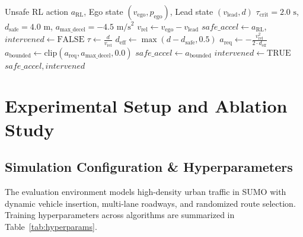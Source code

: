 \documentclass{svproc}
\begin{document}
\begin{algorithm}[htbp]
\caption{Bio-Inspired TTC Safety Shield Gatekeeper ($\mathcal{S}_{\text{TTC}}$)}
\label{alg:bio_shield}
\begin{algorithmic}[1]
\REQUIRE Unsafe RL action $a_{\text{RL}}$, Ego state $(v_{\text{ego}}, p_{\text{ego}})$, Lead state $(v_{\text{lead}}, d)$
\PARAM $\tau_{\text{crit}} = 2.0\text{ s}$, $d_{\text{safe}} = 4.0\text{ m}$, $a_{\text{max\_decel}} = -4.5\text{ m/s}^2$
\STATE $v_{\text{rel}} \leftarrow v_{\text{ego}} - v_{\text{lead}}$
\STATE $safe\_accel \leftarrow a_{\text{RL}}$, $intervened \leftarrow \text{FALSE}$
    \STATE $\tau \leftarrow \frac{d}{v_{\text{rel}}}$
        \STATE $d_{\text{eff}} \leftarrow \max(d - d_{\text{safe}}, 0.5)$
        \STATE $a_{\text{req}} \leftarrow -\frac{v_{\text{rel}}^2}{2 \cdot d_{\text{eff}}}$
        \STATE $a_{\text{bounded}} \leftarrow \text{clip}(a_{\text{req}}, a_{\text{max\_decel}}, 0.0)$
            \STATE $safe\_accel \leftarrow a_{\text{bounded}}$
            \STATE $intervened \leftarrow \text{TRUE}$
        \ENDIF
    \ENDIF
\ENDIF
\RETURN $safe\_accel, intervened$
\end{algorithmic}
\end{algorithm}

\section{Experimental Setup and Ablation Study}\label{sec:experiments}

\subsection{Simulation Configuration \& Hyperparameters}
The evaluation environment models high-density urban traffic in SUMO with dynamic vehicle insertion, multi-lane roadways, and randomized route selection. Training hyperparameters across algorithms are summarized in Table~\ref{tab:hyperparams}.
\end{document}
